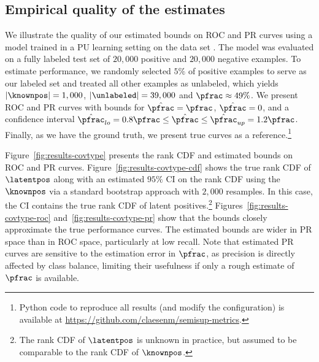 \subsection{Empirical quality of the estimates} \label{empirical}
We illustrate the quality of our estimated bounds on ROC and PR curves using a model trained in a PU learning setting \citep{Claesen2015resvm} on the \covtype data set \citep{Blackard00covtype}. The model was evaluated on a fully labeled test set of $20,000$ positive and $20,000$ negative examples. To estimate performance, we randomly selected $5\%$ of positive examples to serve as our labeled set and treated all other examples as unlabeled, which yields $|\knownpos|=1,000$, $|\unlabeled| = 39,000$ and $\pfrac\approx49\%$. We present ROC and PR curves with bounds for $\hat{\pfrac}=\pfrac$, $\hat{\pfrac}=0$, and a confidence interval $\hat{\pfrac}_{lo} = 0.8\pfrac \leq \hat{\pfrac} \leq \hat{\pfrac}_{up} = 1.2\pfrac$. Finally, as we have the ground truth, we present true curves as a reference.\footnote{Python code to reproduce all results (and modify the configuration) is available at \url{https://github.com/claesenm/semisup-metrics}.}

Figure~\ref{fig:results-covtype} presents  the rank CDF and estimated bounds on ROC and PR curves. Figure~\ref{fig:results-covtype-cdf} shows the true rank CDF of $\latentpos$ along with an estimated $95\%$ CI on the rank CDF using the $\knownpos$ via a standard bootstrap approach with $2,000$ resamples. In this case, the CI contains the true rank CDF of latent positives.\footnote{The rank CDF of $\latentpos$ is unknown in practice, but assumed to be comparable to the rank CDF of $\knownpos$.} Figures~\ref{fig:results-covtype-roc} and~\ref{fig:results-covtype-pr} show that the bounds closely approximate the true performance curves. The estimated bounds are wider in PR space than in ROC space, particularly at low recall. Note that estimated PR curves are sensitive to the estimation error in $\hat{\pfrac}$, as precision is directly affected by class balance, limiting their usefulness if only a rough estimate of $\pfrac$ is available.


